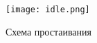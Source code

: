 \begin{figure}[H]
    \centering
    \texttt{[image: idle.png]}
    \caption{Схема простаивания}
    \label{fig:idle}
\end{figure}












